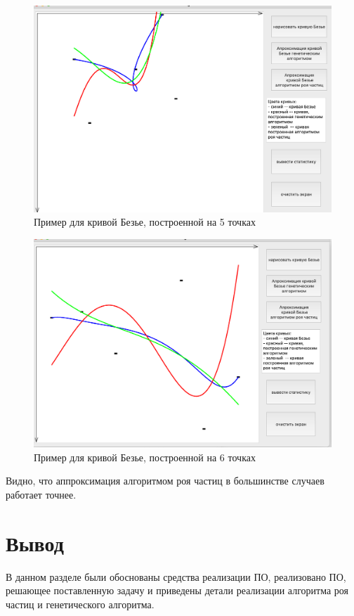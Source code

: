 \documentclass[12pt]{report}
\begin{document}
\begin{figure}[h!]
  \centering
  \includegraphics[width = \linewidth]{5.png}
  \caption{Пример для кривой Безье, построенной на 5 точках}
  \label{fig:points5}
\end{figure}
\newpage
\begin{figure}[h!]
  \centering
  \includegraphics[width = \linewidth]{6.png}
  \caption{Пример для кривой Безье, построенной на 6 точках}
  \label{fig:points6}
\end{figure}

Видно, что аппроксимация алгоритмом роя частиц в большинстве случаев работает точнее.

\section*{Вывод}
В данном разделе были обоснованы средства реализации ПО, реализовано ПО, решающее поставленную задачу и приведены детали реализации алгоритма роя частиц и генетического алгоритма.
\end{document}
